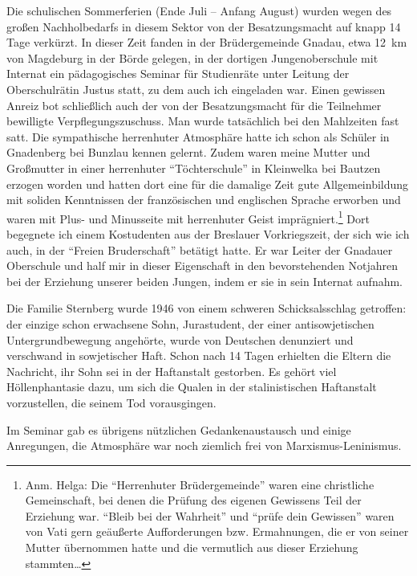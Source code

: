 \documentclass[a5paper,pagesize,10pt,twoside=true]{scrbook}
\renewcommand{\marginpar}[2][]{}
\begin{document}
Die schulischen Sommerferien (Ende Juli -- Anfang August) wurden wegen des großen Nachholbedarfs in diesem Sektor von der Besatzungsmacht auf knapp 14 Tage verkürzt. In dieser Zeit fanden in der Brüdergemeinde Gnadau, etwa \marginpar{132} 12~km von Magdeburg in der Börde gelegen, in der dortigen Jungenoberschule mit Internat ein pädagogisches Seminar für Studienräte unter Leitung der Oberschulrätin Justus statt, zu dem auch ich eingeladen war. Einen gewissen Anreiz bot schließlich auch der von der Besatzungsmacht für die Teilnehmer bewilligte Verpflegungszuschuss. Man wurde tatsächlich bei den Mahlzeiten fast satt. Die sympathische herrenhuter Atmosphäre hatte ich schon als Schüler in Gnadenberg bei Bunzlau kennen gelernt. Zudem waren meine Mutter und Großmutter in einer herrenhuter \enquote{Töchterschule} in Kleinwelka bei Bautzen erzogen worden und hatten dort eine für die damalige Zeit gute Allgemeinbildung mit soliden Kenntnissen der französischen und englischen Sprache erworben und waren mit Plus- und Minusseite mit herrenhuter Geist imprägniert.\footnote{Anm. Helga: Die \enquote{Herrenhuter Brüdergemeinde} waren eine christliche Gemeinschaft, bei denen die Prüfung des eigenen Gewissens Teil der Erziehung war. \enquote{Bleib bei der Wahrheit} und \enquote{prüfe dein Gewissen} waren von Vati gern geäußerte Aufforderungen bzw. Ermahnungen, die er von seiner Mutter übernommen hatte und die vermutlich aus dieser Erziehung stammten\dots} Dort begegnete ich einem Kostudenten aus der Breslauer Vorkriegszeit, der sich wie ich auch, in der \enquote{Freien Bruderschaft} betätigt hatte. Er war Leiter der Gnadauer Oberschule und half mir in dieser Eigenschaft in den bevorstehenden Notjahren bei der Erziehung unserer beiden Jungen, indem er sie in sein Internat aufnahm.

Die Familie Sternberg wurde 1946 von einem schweren Schicksalsschlag getroffen: der einzige schon erwachsene Sohn, Jurastudent, der einer antisowjetischen Untergrundbewegung angehörte, wurde von Deutschen denunziert und verschwand in sowjetischer Haft. Schon nach 14 Tagen erhielten die Eltern die Nachricht, \marginpar{134} ihr Sohn sei in der Haftanstalt gestorben. Es gehört viel Höllenphantasie dazu, um sich die Qualen in der stalinistischen Haftanstalt vorzustellen, die seinem Tod vorausgingen.

Im Seminar gab es übrigens nützlichen Gedankenaustausch und einige Anregungen, die Atmosphäre war noch ziemlich frei von Marxismus-Leninismus.\\
\end{document}
